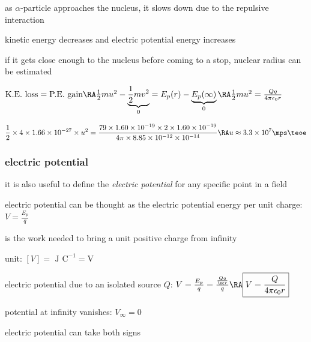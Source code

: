 \sol as $\alpha$-particle approaches the nucleus, it slows down due to the repulsive interaction

kinetic energy decreases and electric potential energy increases

if it gets close enough to the nucleus before coming to a stop, nuclear radius can be estimated

{

\centering

$\text{K.E. loss} = \text{P.E. gain} \RA \frac{1}{2}mu^2 - \underbrace{\frac{1}{2}mv^2}_0 = E_p(r) - \underbrace{E_p(\infty)}_0 \RA  \frac{1}{2}mu^2= \frac{Qq}{4\pi\epsilon_0r}$

}

\begin{equation*}
	\frac{1}{2}\times4\times1.66\times10^{-27}\times u^2 = \frac{79\times1.60\times10^{-19}\times2\times1.60\times10^{-19}}{4\pi\times8.85\times10^{-12}\times10^{-14}} \RA
	u\approx 3.3\times10^7\mps \teoe
\end{equation*}




\subsubsection{electric potential}

it is also useful to define the \emph{electric potential} for any specific point in a field

electric potential can be thought as the electric potential energy per unit charge: $V = \frac{E_p}{q}$

\begin{ilight}
	 is the work needed to bring a unit positive charge from infinity
\end{ilight}

\cmt unit: $[V] = \text{ J C}^{-1} = \text{V}$

\cmt electric potential due to an isolated source $Q$: $V = \frac{E_p}{q} = \frac{\frac{Qq}{\ec r}}{q} \RA \boxed{V = \frac{Q}{4\pi\epsilon_0 r}}$

\cmt potential at infinity vanishes: $V_\infty = 0$

\cmt electric potential can take both signs

